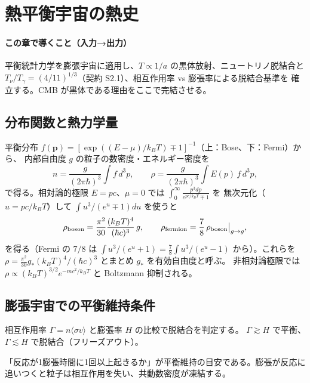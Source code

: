 \section{熱平衡宇宙の熱史}
\label{ch:ch02_thermal}

\paragraph{この章で導くこと（入力→出力）}
平衡統計力学を膨張宇宙に適用し、$T\propto1/a$ の黒体放射、ニュートリノ脱結合と
$T_\nu/T_\gamma=(4/11)^{1/3}$（契約 S2.1）、相互作用率 vs 膨張率による脱結合基準を
確立する。CMB が黒体である理由をここで完結させる。

\subsection{分布関数と熱力学量}
平衡分布 $f(\mathbf p)=[\exp((E-\mu)/k_BT)\mp1]^{-1}$（上：Bose、下：Fermi）から、
内部自由度 $g$ の粒子の数密度・エネルギー密度を
\begin{equation}
  n=\frac{g}{(2\pi\hbar)^3}\!\int\! f\,d^3p,\qquad
  \rho=\frac{g}{(2\pi\hbar)^3}\!\int\! E(p)\,f\,d^3p,
\end{equation}
で得る。相対論的極限 $E=pc$、$\mu=0$ では $\int_0^\infty\frac{p^3dp}{e^{pc/k_BT}\mp1}$ を
無次元化（$u=pc/k_BT$）して $\int u^3/(e^u\mp1)du$ を使うと
\begin{equation}
  \rho_{\rm boson}=\frac{\pi^2}{30}\frac{(k_BT)^4}{(\hbar c)^3}\,g,\qquad
  \rho_{\rm fermion}=\frac{7}{8}\,\rho_{\rm boson}\big|_{g\to g},
  \label{eq:rho_rel}
\end{equation}
を得る（Fermi の $7/8$ は $\int u^3/(e^u+1)=\tfrac78\int u^3/(e^u-1)$ から）。これらを
$\rho=\tfrac{\pi^2}{30}g_*(k_BT)^4/(\hbar c)^3$ とまとめ $g_*$ を有効自由度と呼ぶ。
非相対論極限では $\rho\propto(k_BT)^{3/2}e^{-mc^2/k_BT}$ と Boltzmann 抑制される。

\subsection{膨張宇宙での平衡維持条件}
相互作用率 $\Gamma=n\langle\sigma v\rangle$ と膨張率 $H$ の比較で脱結合を判定する。
$\Gamma\gtrsim H$ で平衡、$\Gamma\lesssim H$ で脱結合（フリーズアウト）。

\begin{intuition}
「反応が1膨張時間に1回以上起きるか」が平衡維持の目安である。膨張が反応に
追いつくと粒子は相互作用を失い、共動数密度が凍結する。
\end{intuition}

